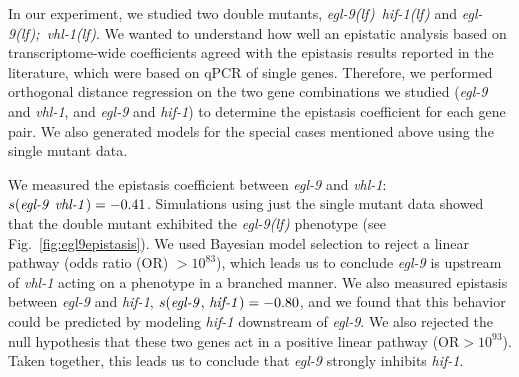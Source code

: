 \documentclass[9pt,twocolumn,twoside]{pnas-new}
\newcommand{\gene}[1]{\mbox{\emph{#1}}}
\newcommand{\egl}{\gene{egl-9(lf)}}
\newcommand{\eglvhl}{\gene{egl-9(lf); vhl-1(lf)}}
\newcommand{\eglhif}{\gene{egl-9(lf) hif-1(lf)}}
\begin{document}
In our experiment, we studied two double mutants, \eglhif{} and \eglvhl{}. We
wanted to understand how well an epistatic analysis based on transcriptome-wide
coefficients agreed with the epistasis results reported in the literature, which
were based on qPCR of single genes. Therefore, we performed orthogonal distance
regression on the two gene combinations we studied (\gene{egl-9} and
\gene{vhl-1}, and \gene{egl-9} and \gene{hif-1}) to determine the epistasis
coefficient for each gene pair. We also generated models for the special cases
mentioned above using the single mutant data.

We measured the epistasis coefficient between \gene{egl-9} and \gene{vhl-1}:
$s({\text{\gene{egl-9} \gene{vhl-1}}}) = -0.41$. Simulations using just the
single mutant data showed that the double mutant exhibited the \egl{} phenotype
(see Fig.~\ref{fig:egl9epistasis}). We used Bayesian model selection to reject a
linear pathway (odds ratio (OR) $>10^{83}$), which leads us to conclude
\gene{egl-9} is upstream of \gene{vhl-1} acting on a phenotype in a branched
manner. We also measured epistasis between \gene{egl-9} and \gene{hif-1},
$s({\text{\gene{egl-9}, \gene{hif-1}}}) = -0.80$, and we found that this
behavior could be predicted by modeling \gene{hif-1} downstream of \gene{egl-9}.
We also rejected the null hypothesis that these two genes act in a positive
linear pathway (OR$> 10^{93}$). Taken together, this leads us to conclude that
\gene{egl-9} strongly inhibits \gene{hif-1}.
\end{document}
